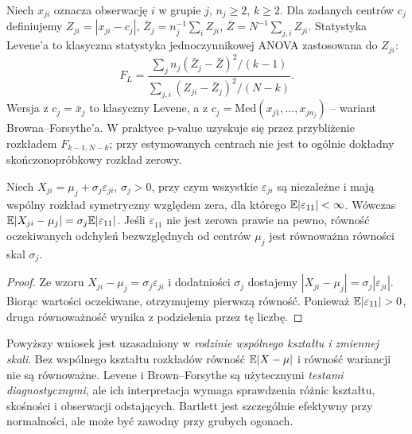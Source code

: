 \begin{definicja}\label{def:levene}
Niech $x_{ji}$ oznacza obserwację $i$ w grupie $j$, $n_j\ge2$, $k\ge2$. Dla zadanych centrów $c_j$ definiujemy $Z_{ji}=|x_{ji}-c_j|$, $\bar Z_j=n_j^{-1}\sum_i Z_{ji}$, $\bar Z=N^{-1}\sum_{j,i} Z_{ji}$. Statystyka Levene'a to klasyczna statystyka jednoczynnikowej ANOVA zastosowana do $Z_{ji}$:
\[
 F_L=\frac{\sum_j n_j(\bar Z_j-\bar Z)^2/(k-1)}{\sum_{j,i}(Z_{ji}-\bar Z_j)^2/(N-k)}.
\]
Wersja z $c_j=\bar x_j$ to klasyczny Levene, a z $c_j=\mathrm{Med}(x_{j1},\ldots,x_{jn_j})$ -- wariant Browna--Forsythe'a. W praktyce p-value uzyskuje się przez przybliżenie rozkładem $F_{k-1,N-k}$; przy estymowanych centrach nie jest to ogólnie dokładny skończonopróbkowy rozkład zerowy.
\end{definicja}

\begin{stwierdzenie}\label{prop:levene-scale}
Niech $X_{ji}=\mu_j+\sigma_j\varepsilon_{ji}$, $\sigma_j>0$, przy czym wszystkie $\varepsilon_{ji}$ są niezależne i mają wspólny rozkład symetryczny względem zera, dla którego $\mathbb E|\varepsilon_{11}|<\infty$. Wówczas $\mathbb E|X_{ji}-\mu_j|=\sigma_j\mathbb E|\varepsilon_{11}|$. Jeśli $\varepsilon_{11}$ nie jest zerowa prawie na pewno, równość oczekiwanych odchyleń bezwzględnych od centrów $\mu_j$ jest równoważna równości skal $\sigma_j$.
\end{stwierdzenie}
\begin{proof}
Ze wzoru $X_{ji}-\mu_j=\sigma_j\varepsilon_{ji}$ i dodatniości $\sigma_j$ dostajemy $|X_{ji}-\mu_j|=\sigma_j|\varepsilon_{ji}|$. Biorąc wartości oczekiwane, otrzymujemy pierwszą równość. Ponieważ $\E|\varepsilon_{11}|>0$, druga równoważność wynika z podzielenia przez tę liczbę.
\end{proof}

\begin{uwaga}
Powyższy wniosek jest uzasadniony w \emph{rodzinie wspólnego kształtu i zmiennej skali}. Bez wspólnego kształtu rozkładów równość $\mathbb E|X-\mu|$ i równość wariancji nie są równoważne. Levene i Brown--Forsythe są użytecznymi \emph{testami diagnostycznymi}, ale ich interpretacja wymaga sprawdzenia różnic kształtu, skośności i obserwacji odstających. Bartlett jest szczególnie efektywny przy normalności, ale może być zawodny przy grubych ogonach.
\end{uwaga}

